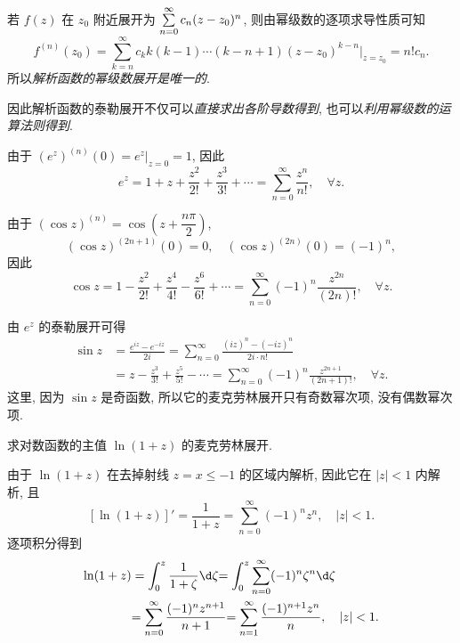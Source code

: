 若 $f(z)$ 在 $z_0$ 附近展开为 $\sum\limits_{n=0}^\infty c_n(z-z_0)^n$,
则由幂级数的逐项求导性质可知
\[f^{(n)}(z_0)=\sum_{k=n}^\infty c_k k(k-1)\cdots(k-n+1)(z-z_0)^{k-n}\Big|_{z=z_0}=n!c_n.\]
所以\emph{解析函数的幂级数展开是唯一的}.

因此解析函数的泰勒展开不仅可以\emph{直接求出各阶导数得到}, 也可以\emph{利用幂级数的运算法则得到}.

\begin{example}\label{exam:exp-taylor-expansion}
	由于 $(e^z)^{(n)}(0)=e^z|_{z=0}=1$, 因此
	\[e^z=1+z+\frac{z^2}{2!}+\frac{z^3}{3!}+\cdots=\sum_{n=0}^\infty\frac{z^n}{n!},\quad\forall z.\]
\end{example}

\begin{example}
	由于 $\displaystyle(\cos z)^{(n)}=\cos\left(z+\dfrac{n\pi}2\right)$,
		\[(\cos z)^{(2n+1)}(0)=0,\quad (\cos z)^{(2n)}(0)=(-1)^n,\]
	因此
		\[\cos z=1-\frac{z^2}{2!}+\frac{z^4}{4!}-\frac{z^6}{6!}+\cdots=\sum_{n=0}^\infty(-1)^n\frac{z^{2n}}{(2n)!},\quad\forall z.\]
\end{example}

\begin{example}
	由 $e^z$ 的泰勒展开可得
	\begin{align*}
		\sin z&=\frac{e^{iz}-e^{-iz}}{2i}
		{=\sum_{n=0}^\infty\frac{(iz)^n-(-iz)^n}{2i\cdot n!}}\\
		&=z-\frac{z^3}{3!}+\frac{z^5}{5!}-\cdots
		=\sum_{n=0}^\infty(-1)^n\frac{z^{2n+1}}{(2n+1)!},\quad\forall z.
	\end{align*}
		这里, 因为 $\sin z$ 是奇函数, 所以它的麦克劳林展开只有奇数幂次项, 没有偶数幂次项.
\end{example}

\begin{example}
求对数函数的主值 $\ln(1+z)$ 的麦克劳林展开.
\end{example}
\begin{solution}
由于 $\ln(1+z)$ 在去掉射线 $z=x\le-1$ 的区域内解析,
{因此它在 $|z|<1$ 内解析,
}{且
	\[[\ln(1+z)]'=\frac1{1+z}=\sum_{n=0}^\infty(-1)^nz^n,\quad|z|<1.\]
}{逐项积分得到
\begin{align*}
\ln(1+z)&=\int_0^z\frac1{1+\zeta}\d\zeta
	{=\int_0^z\sum_{n=0}^\infty(-1)^n\zeta^n\d\zeta}\\
&{=\sum_{n=0}^\infty\frac{(-1)^nz^{n+1}}{n+1}}
	{=\sum_{n=1}^\infty\frac{(-1)^{n+1}z^n}{n},\quad|z|<1.}
\end{align*}}
\end{solution}

